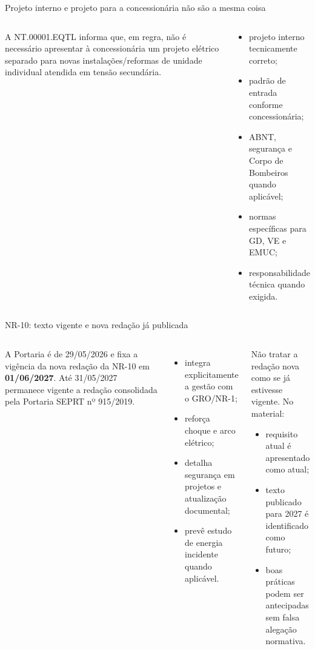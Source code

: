 \begin{frame}{Projeto interno e projeto para a concessionária não são a mesma coisa}
\small
\begin{columns}[T,onlytextwidth]
\begin{caixaNorma}[title=Unidade individual em BT]
A NT.00001.EQTL informa que, em regra, não é necessário apresentar à concessionária um projeto elétrico separado para novas instalações/reformas de unidade individual atendida em tensão secundária.
\end{caixaNorma}
\begin{caixaAt}[title=Mas continuam obrigatórios]
\begin{itemize}
\item projeto interno tecnicamente correto;
\item padrão de entrada conforme concessionária;
\item ABNT, segurança e Corpo de Bombeiros quando aplicável;
\item normas específicas para GD, VE e EMUC;
\item responsabilidade técnica quando exigida.
\end{itemize}
\end{caixaAt}
\end{columns}
\end{frame}

\begin{frame}{NR-10: texto vigente e nova redação já publicada}
\small
\begin{columns}[T,onlytextwidth]
\begin{caixaNorma}[title=Portaria MTE nº 737/2026]
A Portaria é de 29/05/2026 e fixa a vigência da nova redação da NR-10 em \textbf{01/06/2027}. Até 31/05/2027 permanece vigente a redação consolidada pela Portaria SEPRT nº 915/2019.
\end{caixaNorma}
\begin{itemize}
\item integra explicitamente a gestão com o GRO/NR-1;
\item reforça choque e arco elétrico;
\item detalha segurança em projetos e atualização documental;
\item prevê estudo de energia incidente quando aplicável.
\end{itemize}
\begin{caixaAt}[title=Como aplicar em agosto de 2026]
Não tratar a redação nova como se já estivesse vigente. No material:
\begin{itemize}
\item requisito atual é apresentado como atual;
\item texto publicado para 2027 é identificado como futuro;
\item boas práticas podem ser antecipadas sem falsa alegação normativa.
\end{itemize}
\end{caixaAt}
\end{columns}
\end{frame}

